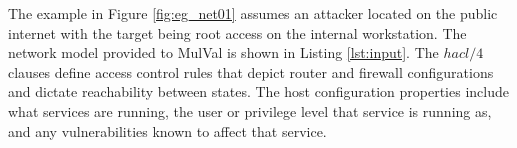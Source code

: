 The example in Figure \ref{fig:eg_net01} assumes an attacker located on the public internet with the target being root access on the internal workstation. The network model provided to MulVal is shown in Listing \ref{lst:input}. The $hacl/4$ clauses define access control rules that depict router and firewall configurations and dictate reachability between states. The host configuration properties include what services are running, the user or privilege level that service is running as, and any vulnerabilities known to affect that service.









